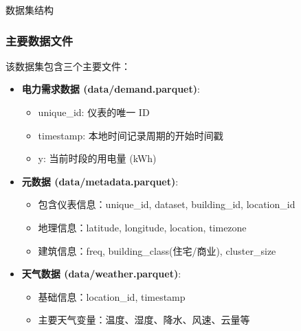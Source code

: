\documentclass{beamer} %
\begin{document}
\begin{frame}{数据集结构}
    \frametitle{主要数据文件}
    该数据集包含三个主要文件：
    \begin{itemize}
        \item \textbf{电力需求数据 (data/demand.parquet)}:
        \begin{itemize}
            \item unique\_id: 仪表的唯一 ID
            \item timestamp: 本地时间记录周期的开始时间戳
            \item y: 当前时段的用电量 (kWh)
        \end{itemize}
        \item \textbf{元数据 (data/metadata.parquet)}:
        \begin{itemize}
            \item 包含仪表信息：unique\_id, dataset, building\_id, location\_id
            \item 地理信息：latitude, longitude, location, timezone
            \item 建筑信息：freq, building\_class(住宅/商业), cluster\_size
        \end{itemize}
        \item \textbf{天气数据 (data/weather.parquet)}:
        \begin{itemize}
            \item 基础信息：location\_id, timestamp
            \item 主要天气变量：温度、湿度、降水、风速、云量等
        \end{itemize}
    \end{itemize}
\end{frame}
\end{document}
